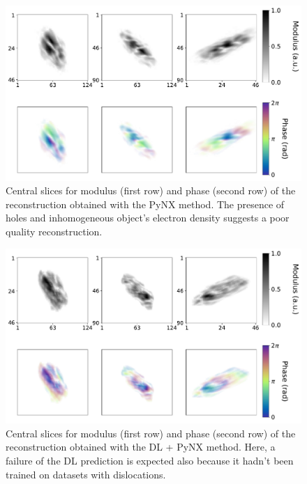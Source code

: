 \begin{figure}[H]
  \centering
  \includegraphics[width=\textwidth]{figures/AD/pynx_mouad.pdf}
  \caption{Central slices for modulus (first row) and phase (second row) of the reconstruction obtained with the PyNX method.
  The presence of holes and inhomogeneous object's electron density suggests a poor quality reconstruction. }
  \label{fig:pynx_mouad}
\end{figure}

\begin{figure}[H]
  \centering
  \includegraphics[width=\textwidth]{figures/AD/dl_pynx_mouad.pdf}
  \caption{Central slices for modulus (first row) and phase (second row) of the reconstruction obtained with the DL + PyNX 
  method. Here, a failure of the DL prediction is expected also because it hadn't been trained on datasets with dislocations. }
  \label{fig:dl_pynx_mouad}
\end{figure}

